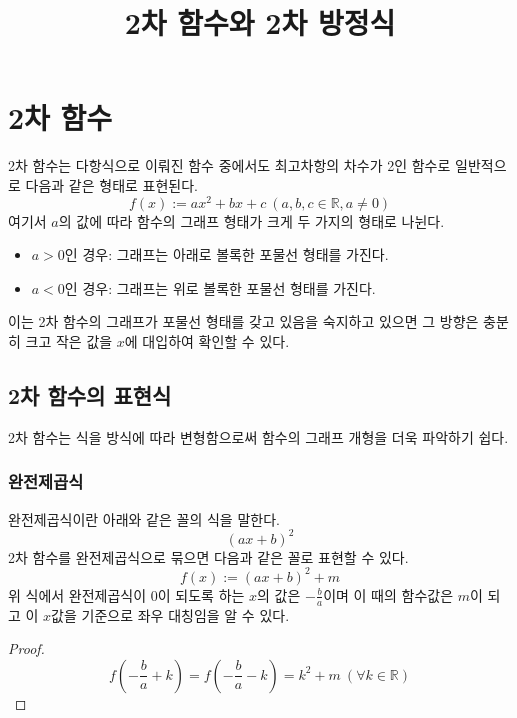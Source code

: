 \documentclass[twocolumn]{article}
\begin{document}
\title{2차 함수와 2차 방정식}
\author{}
\date{}

\maketitle

\section{2차 함수}
2차 함수는 다항식으로 이뤄진 함수 중에서도 최고차항의 차수가 2인 함수로
일반적으로 다음과 같은 형태로 표현된다.
\[
f(x) := ax^2 + bx + c\ (a, b, c \in \mathbb{R}, a \neq 0)
\]
여기서 \(a\)의 값에 따라 함수의 그래프 형태가 크게 두 가지의 형태로 나뉜다.
\begin{itemize}
    \item \(a > 0\)인 경우: 그래프는 아래로 볼록한 포물선 형태를 가진다.
    \item \(a < 0\)인 경우: 그래프는 위로 볼록한 포물선 형태를 가진다.
\end{itemize}
이는 2차 함수의 그래프가 포물선 형태를 갖고 있음을 숙지하고 있으면 그 방향은
충분히 크고 작은 값을 $x$에 대입하여 확인할 수 있다.

\subsection{2차 함수의 표현식}
2차 함수는 식을 방식에 따라 변형함으로써 함수의 그래프 개형을 더욱 파악하기 쉽다.
\subsubsection{완전제곱식}
완전제곱식이란 아래와 같은 꼴의 식을 말한다.
\[
(ax + b)^2
\]
2차 함수를 완전제곱식으로 묶으면 다음과 같은 꼴로 표현할 수 있다.
\[
f(x) := (ax + b)^2 + m
\]
위 식에서 완전제곱식이 0이 되도록 하는 $x$의 값은 $-\frac{b}{a}$이며
이 때의 함수값은 $m$이 되고 이 $x$값을 기준으로 좌우 대칭임을 알 수 있다.

\begin{proof}
\[
f(-\frac{b}{a} + k) = f(-\frac{b}{a} - k) = k^2 + m\ (\forall k \in \mathbb{R})
\]
\end{proof}
\end{document}
